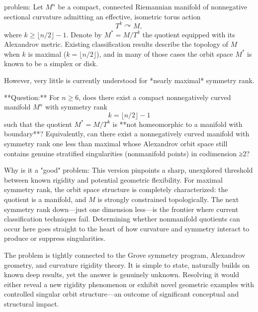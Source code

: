problem:  
Let \( M^n \) be a compact, connected Riemannian manifold of nonnegative sectional curvature admitting an effective, isometric torus action  
\[
T^k \curvearrowright M,
\]
where \(k \ge \lfloor n/2 \rfloor - 1\).  Denote by \(M^* = M/T^k\) the quotient equipped with its Alexandrov metric.  
Existing classification results describe the topology of \(M\) when \(k\) is maximal (\(k = \lfloor n/2 \rfloor\)), and in many of those cases the orbit space \(M^*\) is known to be a simplex or disk.  

However, very little is currently understood for *nearly maximal* symmetry rank.  

**Question:**  
For \(n \ge 6\), does there exist a compact nonnegatively curved manifold \(M^n\) with symmetry rank  
\[
k = \lfloor n/2 \rfloor - 1
\]
such that the quotient \(M^* = M/T^k\) is **not homeomorphic to a manifold with boundary**?   
Equivalently, can there exist a nonnegatively curved manifold with symmetry rank one less than maximal whose Alexandrov orbit space still contains genuine stratified singularities (nonmanifold points) in codimension ≥2?

Why is it a "good" problem:  
This version pinpoints a sharp, unexplored threshold between known rigidity and potential geometric flexibility. For maximal symmetry rank, the orbit space structure is completely characterized: the quotient is a manifold, and \(M\) is strongly constrained topologically. The next symmetry rank down—just one dimension less—is the frontier where current classification techniques fail. Determining whether nonmanifold quotients can occur here goes straight to the heart of how curvature and symmetry interact to produce or suppress singularities.  

The problem is tightly connected to the Grove symmetry program, Alexandrov geometry, and curvature rigidity theory. It is simple to state, naturally builds on known deep results, yet the answer is genuinely unknown. Resolving it would either reveal a new rigidity phenomenon or exhibit novel geometric examples with controlled singular orbit structure—an outcome of significant conceptual and structural impact.